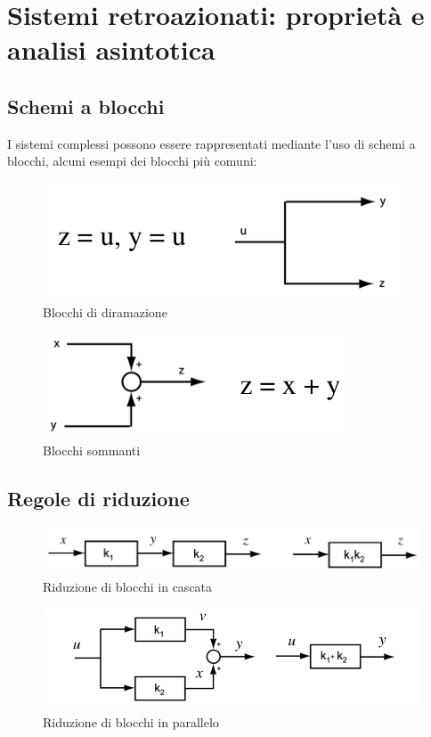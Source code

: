 \section{Sistemi retroazionati: proprietà e analisi asintotica}

\subsection{Schemi a blocchi}
I sistemi complessi possono essere rappresentati mediante l'uso di schemi
a blocchi, alcuni esempi dei blocchi pi\`u comuni:

\begin{figure}[h!]
    \centering
    \includegraphics[width=0.3\linewidth]{images/blocchi_diramazione.png}
    \caption{Blocchi di diramazione}
    \label{fig:diramazione}
\end{figure}

\begin{figure}[h!]
    \centering
    \includegraphics[width=0.3\linewidth]{images/blocchi_sommanti.png}
    \caption{Blocchi sommanti}
    \label{fig:sommanti}
\end{figure}


\subsection{Regole di riduzione}
\begin{figure}[h!]
    \centering
    \includegraphics[width=0.3\linewidth]{images/riduzione_cascata.png}
    \caption{Riduzione di blocchi in cascata}
    \label{fig:cascata}
\end{figure}

\begin{figure}[h!]
    \centering
    \includegraphics[width=0.3\linewidth]{images/riduzione_parallelo.png}
    \caption{Riduzione di blocchi in parallelo}
    \label{fig:parallelo}
\end{figure}


